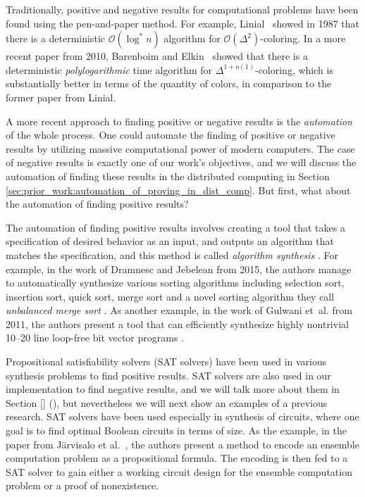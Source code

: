Traditionally, positive and negative results for computational problems have been found using the pen-and-paper method.
For example, Linial\ \cite{DBLP:conf/focs/Linial87} showed in 1987 that there is a deterministic \(\mathcal{O}(\log^* n)\) algorithm for \(\mathcal{O}(\Delta^2)\)-coloring.
In a more recent paper from 2010, Barenboim and Elkin\ \cite{DBLP:conf/podc/BarenboimE10} showed that there is a deterministic \emph{polylogarithmic} time algorithm for \(\Delta^{1 + o(1)}\)-coloring, which is substantially better in terms of the quantity of colors, in comparison to the former paper \cite{DBLP:conf/focs/Linial87} from Linial.

A more recent approach to finding positive or negative results is the \emph{automation} of the whole process.
One could automate the finding of positive or negative results by utilizing massive computational power of modern computers.
The case of negative results is exactly one of our work's objectives, and we will discuss the automation of finding these results in the distributed computing in Section \ref{sec:prior_work:automation_of_proving_in_dist_comp}.
But first, what about the automation of finding positive results?

The automation of finding positive results involves creating a tool that takes a specification of desired behavior as an input, and outputs an algorithm that matches the specification, and this method is called \emph{algorithm synthesis} \cite{DBLP:phd/basesearch/Rybicki16}.
For example, in the work of Dramnesc and Jebelean from 2015, the authors manage to automatically synthesize various sorting algorithms including selection sort, insertion sort, quick sort, merge sort and a novel sorting algorithm they call \emph{unbalanced merge sort} \cite{DBLP:journals/jsc/DramnescJ15}.
As another example, in the work of Gulwani et~al. from 2011, the authors present a tool that can efficiently synthesize highly nontrivial 10--20 line loop-free bit vector programs \cite{DBLP:conf/pldi/GulwaniJTV11}.

Propositional satisfiability solvers (SAT solvers) have been used in various synthesis problems to find positive results.
SAT solvers are also used in our implementation to find negative results, and we will talk more about them in Section \ref{} (), but nevertheless we will next show an examples of a previous research.
SAT solvers have been used especially in synthesis of circuits, where one goal is to find optimal Boolean circuits in terms of size.
As the example, in the paper from Järvisalo et al.\ \cite{DBLP:conf/sat/JarvisaloKKK12}, the authors present a method to encode an ensemble computation problem as a propositional formula.
The encoding is then fed to a SAT solver to gain either a working circuit design for the ensemble computation problem or a proof of nonexistence.

